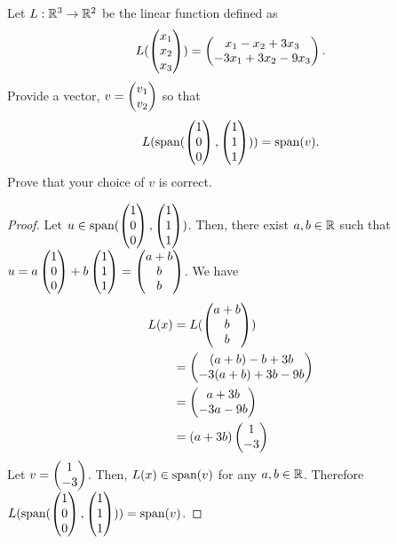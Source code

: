 \begin{question}
	\normalfont
	Let $L:{\mathbb R}^3\to{\mathbb R}^2$ be the linear function defined as
		\begin{align*}
			L(\begin{pmatrix} x_1\\ x_2\\ x_3\end{pmatrix}) = \begin{pmatrix} x_1-x_2+3x_3\\ -3x_1+3x_2-9x_3\end{pmatrix}.
		\end{align*}
		Provide a vector, $v=\begin{pmatrix} v_1\\ v_2\end{pmatrix}$ so that 
			\begin{align*}
				L(\textnormal{span}(\begin{pmatrix} 1\\ 0\\ 0\end{pmatrix}, \begin{pmatrix} 1\\ 1\\ 1\end{pmatrix} ) )= \textnormal{span}(v).
			\end{align*}
			Prove that your choice of $v$ is correct.
\end{question}

\begin{proof}
	\renewcommand{\qedsymbol}{$\blacksquare$}
	Let $u\in\textnormal{span}(\begin{pmatrix} 1\\ 0\\ 0\end{pmatrix},\begin{pmatrix} 1\\ 1\\ 1\end{pmatrix})$. Then, there exist $a,b\in\mathbb R$ such that $u=a \begin{pmatrix} 1\\ 0\\ 0\end{pmatrix}+b \begin{pmatrix} 1\\ 1\\ 1\end{pmatrix}=\begin{pmatrix} a+b\\ b\\ b\end{pmatrix}$.
	We have
	\begin{equation*}
		\begin{aligned}
			L(x)
			&= L(\begin{pmatrix} a+b\\ b\\ b\end{pmatrix})\\
			&= \begin{pmatrix} (a+b)-b+3b\\ -3(a+b)+3b-9b\end{pmatrix}\\
			&= \begin{pmatrix} a+3b\\ -3a-9b\end{pmatrix}\\
			&= (a+3b)\begin{pmatrix} 1\\ -3\end{pmatrix}
		\end{aligned}
	\end{equation*}
	Let $v=\begin{pmatrix} 1\\ -3\end{pmatrix}$. Then, $L(x)\in\textnormal{span}(v)$ for any $a,b\in\mathbb R$. Therefore $L(\textnormal{span}(\begin{pmatrix} 1\\ 0\\ 0\end{pmatrix},\begin{pmatrix} 1\\ 1\\ 1\end{pmatrix}))=\textnormal{span}(v)$.
\end{proof}